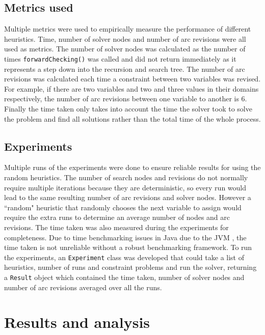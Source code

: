 \documentclass{article}
\begin{document}
\subsection{Metrics used}

Multiple metrics were used to empirically measure the performance of different heuristics. Time, number of solver nodes and number of arc revisions were all used as metrics. The number of solver nodes was calculated as the number of times \texttt{forwardChecking()} was called and did not return immediately as it represents a step down into the recursion and search tree. The number of arc revisions was calculated each time a constraint between two variables was revised. For example, if there are two variables and two and three values in their domains respectively, the number of arc revisions between one variable to another is 6. Finally the time taken only takes into account the time the solver took to solve the problem and find all solutions rather than the total time of the whole process. 

\subsection{Experiments}
Multiple runs of the experiments were done to ensure reliable results for using the random heuristics. The number of search nodes and revisions do not normally require multiple iterations because they are deterministic, so every run would lead to the same resulting number of arc revisions and solver nodes. However a ``random" heuristic that randomly chooses the next variable to assign would require the extra runs to determine an average number of nodes and arc revisions.
\n
The time taken was also measured during the experiments for completeness. Due to time benchmarking issues in Java due to the JVM \cite{jvm-benchmark}, the time taken is not unreliable without a robust benchmarking framework. 
\n
To run the experiments, an \texttt{Experiment} class was developed that could take a list of heuristics, number of runs and constraint problems and run the solver, returning a \texttt{Result} object which contained the time taken, number of solver nodes and number of arc revisions averaged over all the runs. 

\section{Results and analysis}
\end{document}
